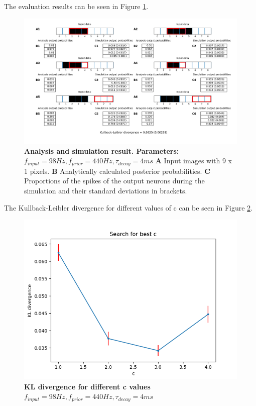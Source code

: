 The evaluation results can be seen in Figure \ref{fig:1DTrainingEvaluation}.
\begin{figure}
  \includegraphics[width=\linewidth]{figures/1D/training/trainingEvaluation_98_440_4.png}
  \caption{\textbf{Analysis and simulation result. Parameters: } $f_{input} = 98 Hz, f_{prior} = 440 Hz, \tau_{decay} = 4 ms$ \textbf{A} Input images with 9 x 1 pixels. \textbf{B} Analytically calculated posterior probabilities. \textbf{C} Proportions of the spikes of the output neurons during the simulation and their standard deviations in brackets.}
  \label{fig:1DTrainingEvaluation}
\end{figure}

The Kullback-Leibler divergence for different values of c can be seen in Figure \ref{fig:1DTrainingC}.
\begin{figure}
  \includegraphics[width=\linewidth]{figures/1D/training/KLD_cvsfInput98_fPrior440tau4.png}
  \caption{\textbf{KL divergence for different c values} $f_{input} = 98 Hz, f_{prior} = 440 Hz, \tau_{decay} = 4 ms$}
  \label{fig:1DTrainingC}
\end{figure}

